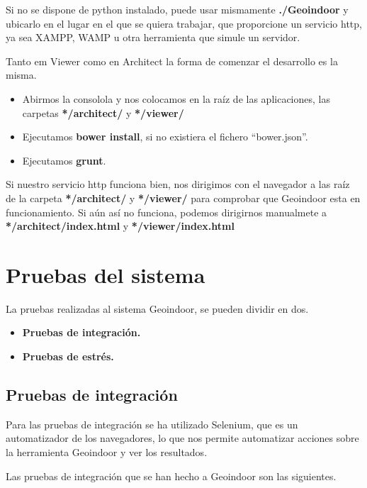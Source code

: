 Si no se dispone de python instalado, puede usar mismamente \textbf{./Geoindoor} y ubicarlo en el lugar en el que se quiera trabajar, que proporcione un servicio http, ya sea XAMPP, WAMP u otra herramienta que simule un servidor.

Tanto em Viewer como en Architect la forma de comenzar el desarrollo es la misma.

\begin{itemize}
	\item Abirmos la consolola y nos colocamos en la raíz de las aplicaciones, las carpetas \textbf{*/architect/} y \textbf{*/viewer/}
	\item Ejecutamos \textbf{bower install}, si no existiera el fichero ``bower.json''.
	\item Ejecutamos \textbf{grunt}.
\end{itemize}

Si nuestro servicio http funciona bien, nos dirigimos con el navegador a las raíz de la carpeta \textbf{*/architect/} y \textbf{*/viewer/} para comprobar que Geoindoor esta en funcionamiento.
Si aún así no funciona, podemos dirigirnos manualmete a \textbf{*/architect/index.html} y \textbf{*/viewer/index.html} 


\section{Pruebas del sistema}

La pruebas realizadas al sistema Geoindoor, se pueden dividir en dos.

\begin{itemize}
	\item \textbf{Pruebas de integración.}
	\item \textbf{Pruebas de estrés.}
\end{itemize} 

\subsection{Pruebas de integración}

Para las pruebas de integración se ha utilizado Selenium, que es un automatizador de los navegadores, lo que nos permite automatizar acciones sobre la herramienta Geoindoor y ver los resultados.

Las pruebas de integración que se han hecho a Geoindoor son las siguientes.

